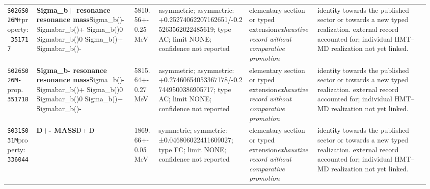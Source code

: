 \begin{landscape}
\begin{longtable}{L{1.85cm}L{4.45cm}L{2.35cm}L{4.05cm}L{3.35cm}L{7.15cm}}
\texttt{S026}\newline \texttt{S026M+}\newline property:\ \texttt{351717} & \textbf{Sigma\_\allowbreak{}b+ resonance resonance mass}\newline Sigma\_\allowbreak{}b()- \textbar{}\allowbreak{} Sigmabar\_\allowbreak{}b()+ \textbar{}\allowbreak{} Sigma\_\allowbreak{}b()0 \textbar{}\allowbreak{} Sigmabar\_\allowbreak{}b()0 \textbar{}\allowbreak{} Sigma\_\allowbreak{}b()+ \textbar{}\allowbreak{} Sigmabar\_\allowbreak{}b()- & 5810.56+-0.25\,MeV & asymmetric; asymmetric: +0.25274062207162651/-0.25263562022485619; type AC; limit NONE; confidence not reported & elementary section or typed extension\newline \emph{exhaustive record without comparative promotion} & identity towards the published sector or towards a new typed realization. external record accounted for; individual HMT--MD realization not yet linked. \\
\texttt{S026}\newline \texttt{S026M-}\newline prop.\ \texttt{351718} & \textbf{Sigma\_\allowbreak{}b- resonance resonance mass}\newline Sigma\_\allowbreak{}b()- \textbar{}\allowbreak{} Sigmabar\_\allowbreak{}b()+ \textbar{}\allowbreak{} Sigma\_\allowbreak{}b()0 \textbar{}\allowbreak{} Sigmabar\_\allowbreak{}b()0 \textbar{}\allowbreak{} Sigma\_\allowbreak{}b()+ \textbar{}\allowbreak{} Sigmabar\_\allowbreak{}b()- & 5815.64+-0.27\,MeV & asymmetric; asymmetric: +0.27460654053367178/-0.27449500386905717; type AC; limit NONE; confidence not reported & elementary section or typed extension\newline \emph{exhaustive record without comparative promotion} & identity towards the published sector or towards a new typed realization. external record accounted for; individual HMT--MD realization not yet linked. \\
\texttt{S031}\newline \texttt{S031M}\newline property:\ \texttt{336044} & \textbf{D+- MASS}\newline D+ \textbar{}\allowbreak{} D- & 1869.66+-0.05\,MeV & symmetric; symmetric: ±0.046806022411609027; type FC; limit NONE; confidence not reported & elementary section or typed extension\newline \emph{exhaustive record without comparative promotion} & identity towards the published sector or towards a new typed realization. external record accounted for; individual HMT--MD realization not yet linked. \\

\end{longtable}
\end{landscape}
